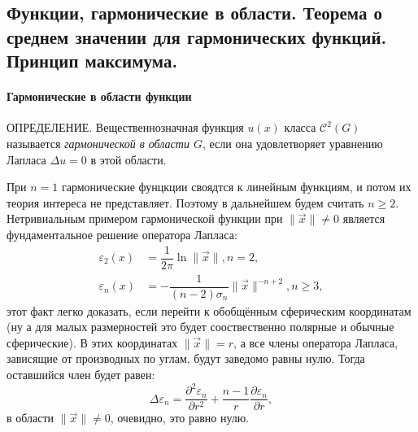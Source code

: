 \subsection{Функции, гармонические в области. Теорема о среднем значении для гармонических
функций. Принцип максимума.}

\paragraph{Гармонические в области функции}
ОПРЕДЕЛЕНИЕ. Вещественнозначная функция $u(x)$ класса $\mathcal{C}^2 (G)$ называется 
\emph{гармонической в области $G$}, если она удовлетворяет уравнению Лапласа $\Delta u = 0$
в этой области.

При $n=1$ гармонические фунцкции своядтся к линейным функциям, и потом их теория интереса
не представляет. Поэтому в дальнейшем будем считать $n \geqslant 2$. Нетривиальным примером
гармонической функции при $\| \vec{x} \| \neq 0$ является фундаментальное решение оператора
Лапласа:
\begin{align*}
  \varepsilon_2 (x) &= \dfrac{1}{2\pi} \ln \| \vec{x} \|, n = 2, \\
  \varepsilon_n (x) &= - \dfrac{1}{(n-2) \sigma_n} \| \vec{x} \|^{-n+2}, n \geqslant 3,
\end{align*}
этот факт легко доказать, если перейти к обобщённым сферическим координатам (ну а для малых
размерностей это будет сооствественно полярные и обычные сферические). В этих координатах
$\| \vec{x} \| = r$, а все члены оператора Лапласа, зависящие от производных по углам, будут
заведомо равны нулю. Тогда оставшийся член будет равен:
\[
  \Delta \varepsilon_n = 
  \dfrac{\partial^2 \varepsilon_n}{\partial r^2} 
  + \dfrac{n-1}{r} \dfrac{\partial \varepsilon_n}{\partial r}, 
\]
в области $\|\vec{x}\| \neq 0$, очевидно, это равно нулю.
